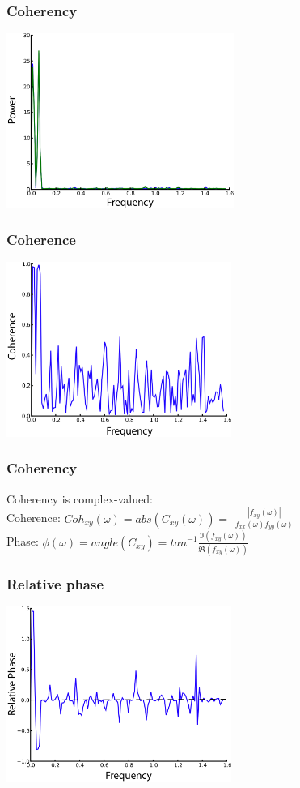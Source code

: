 \documentclass{beamer}
\begin{document}
\begin{frame}
\frametitle{Coherency}
\includegraphics[height=5.7cm]{figures/outa_phase_tseries_psd}
\end{frame}

\begin{frame}
\frametitle{Coherence}
\includegraphics[height=5.7cm]{figures/outa_phase_tseries_coh}
\end{frame}

\begin{frame}
\frametitle{Coherency}
Coherency is complex-valued:
\\
\vfill
Coherence: $Coh_{xy} (\omega) = abs(C_{xy}(\omega)) = $
$\frac{|f_{xy}(\omega)|}{f_{xx}(\omega)f_{yy}(\omega)}$
\\
\pause
\vfill
Phase: $\phi(\omega)= angle(C_{xy}) = tan^{-1}\frac{\Im(f_{xy}(\omega))}{\Re(f_{xy}(\omega))}$
\end{frame}


\begin{frame}
\frametitle{Relative phase}
\includegraphics[height=5.7cm]{figures/outa_phase_tseries_ph}
\end{frame}
\end{document}
